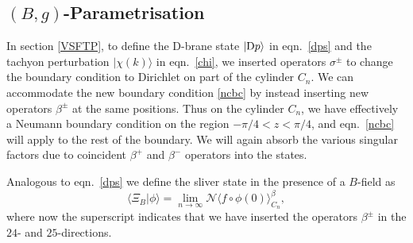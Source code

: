 \documentclass[letterpaper,12pt]{article}
\def\Pcm#1{{\mathcal{#1}}}
\def\er#1{eqn.~\eqref{#1}}
\newcommand{\Dp}{\textup{D}p}
\begin{document}

\subsection{$(B,g)$-Parametrisation}

In section \ref{VSFTP}, to define the D-brane state $|\Dp\rangle$ in \er{dps} and the 
tachyon perturbation $|\chi(k)\rangle$ in \er{chi}, we inserted operators $\sigma^\pm$ to 
change the boundary condition to Dirichlet on part of the cylinder $C_n$. We can accommodate 
the new boundary condition \eqref{ncbc} by instead inserting new operators $\beta^\pm$ at the
same positions. Thus on the cylinder $C_n$, we have effectively a Neumann boundary condition
on the region $-\pi/4 < z < \pi/4$, and \er{ncbc} will apply to the rest of the boundary.
We will again absorb the various singular factors due to coincident $\beta^+$ and $\beta^-$ 
operators into the states.

Analogous to \er{dps} we define the sliver state in the presence of a $B$-field as
\begin{equation}
\label{xiB}
\big\langle \Xi_B \big| \phi \big\rangle = \lim_{n \rightarrow \infty} 
                       \Pcm{N}\big\langle f \circ \phi(0) \big\rangle^{\beta}_{C_n}
,\end{equation}
where now the superscript indicates that we have inserted the operators $\beta^\pm$ in
the $24$- and $25$-directions.
\end{document}

